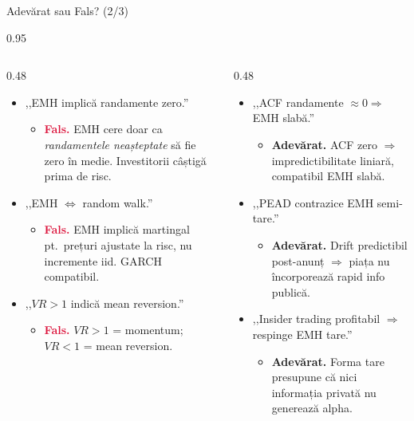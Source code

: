 \documentclass[9pt, aspectratio=169, t]{beamer}
\begin{document}
\begin{frame}[shrink=15]{Adevărat sau Fals? (2/3)}
\begin{cminipage}{0.95\textwidth}
\begin{columns}[T]
\begin{column}{0.48\textwidth}
\begin{itemize}\setlength{\itemsep}{1pt}
    \item ,,EMH implică randamente zero.''
    \begin{itemize}\setlength{\itemsep}{0pt}
        \item[] \textcolor{Crimson}{\textbf{Fals.}} EMH cere doar ca \emph{randamentele neașteptate} să fie zero în medie. Investitorii câștigă prima de risc.
    \end{itemize}
    \item ,,EMH $\Leftrightarrow$ random walk.''
    \begin{itemize}\setlength{\itemsep}{0pt}
        \item[] \textcolor{Crimson}{\textbf{Fals.}} EMH implică martingal pt.\ prețuri ajustate la risc, nu incremente iid. GARCH compatibil.
    \end{itemize}
    \item ,,$VR > 1$ indică mean reversion.''
    \begin{itemize}\setlength{\itemsep}{0pt}
        \item[] \textcolor{Crimson}{\textbf{Fals.}} $VR > 1$ = momentum; $VR < 1$ = mean reversion.
    \end{itemize}
\end{itemize}
\end{column}
\begin{column}{0.48\textwidth}
\begin{itemize}\setlength{\itemsep}{1pt}
    \item ,,ACF randamente $\approx 0 \Rightarrow$ EMH slabă.''
    \begin{itemize}\setlength{\itemsep}{0pt}
        \item[] \textcolor{Forest}{\textbf{Adevărat.}} ACF zero $\Rightarrow$ impredictibilitate liniară, compatibil EMH slabă.
    \end{itemize}
    \item ,,PEAD contrazice EMH semi-tare.''
    \begin{itemize}\setlength{\itemsep}{0pt}
        \item[] \textcolor{Forest}{\textbf{Adevărat.}} Drift predictibil post-anunț $\Rightarrow$ piața nu încorporează rapid info publică.
    \end{itemize}
    \item ,,Insider trading profitabil $\Rightarrow$ respinge EMH tare.''
    \begin{itemize}\setlength{\itemsep}{0pt}
        \item[] \textcolor{Forest}{\textbf{Adevărat.}} Forma tare presupune că nici informația privată nu generează alpha.
    \end{itemize}
\end{itemize}
\end{column}
\end{columns}
\end{cminipage}
\end{frame}
\end{document}
